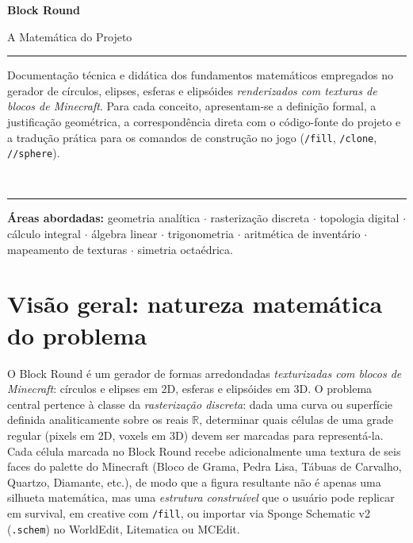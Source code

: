 \documentclass[12pt,a4paper]{scrartcl}
\newcommand{\code}[1]{\texttt{\small #1}}
\newcommand{\cmd}[1]{\textcolor{earth}{\texttt{\small #1}}}
\begin{document}
\begin{titlepage}
  \centering
  \vspace*{3.5cm}
  {\sffamily\bfseries\fontsize{56}{60}\selectfont \color{accent} Block Round\par}
  \vspace{0.7cm}
  {\sffamily\LARGE\color{muted} A Matemática do Projeto\par}
  \vspace{1.4cm}
  {\color{rule}\rule{0.6\textwidth}{0.6pt}\par}
  \vspace{0.9cm}
  \begin{minipage}{0.82\textwidth}
    \centering\color{ink}\large
    Documentação técnica e didática dos fundamentos matemáticos empregados no gerador de círculos, elipses, esferas e elipsóides \emph{renderizados com texturas de blocos de Minecraft}. Para cada conceito, apresentam-se a definição formal, a justificação geométrica, a correspondência direta com o código-fonte do projeto e a tradução prática para os comandos de construção no jogo (\cmd{/fill}, \cmd{/clone}, \cmd{//sphere}).
  \end{minipage}
  \vspace{0.9cm}\\
  {\color{rule}\rule{0.6\textwidth}{0.6pt}\par}
  \vspace{2cm}
  \begin{minipage}{0.78\textwidth}
    \centering\sffamily\small\color{muted}
    \textbf{Áreas abordadas:} geometria analítica $\cdot$ rasterização discreta $\cdot$ topologia digital $\cdot$ cálculo integral $\cdot$ álgebra linear $\cdot$ trigonometria $\cdot$ aritmética de inventário $\cdot$ mapeamento de texturas $\cdot$ simetria octaédrica.
  \end{minipage}
\end{titlepage}

\renewcommand{\contentsname}{\color{accent}Sumário}
\tableofcontents
\thispagestyle{fancy}
\newpage

\section{Visão geral: natureza matemática do problema}

O Block Round é um gerador de formas arredondadas \emph{texturizadas com blocos de Minecraft}: círculos e elipses em 2D, esferas e elipsóides em 3D. O problema central pertence à classe da \emph{rasterização discreta}: dada uma curva ou superfície definida analiticamente sobre os reais $\mathbb{R}$, determinar quais células de uma grade regular (pixels em 2D, voxels em 3D) devem ser marcadas para representá-la. Cada célula marcada no Block Round recebe adicionalmente uma textura de seis faces do palette do Minecraft (Bloco de Grama, Pedra Lisa, Tábuas de Carvalho, Quartzo, Diamante, etc.), de modo que a figura resultante não é apenas uma silhueta matemática, mas uma \emph{estrutura construível} que o usuário pode replicar em survival, em creative com \cmd{/fill}, ou importar via Sponge Schematic v2 (\code{.schem}) no WorldEdit, Litematica ou MCEdit.
\end{document}
